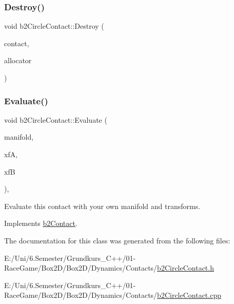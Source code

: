 \subsubsection{\texorpdfstring{Destroy()}{Destroy()}}
{\footnotesize\ttfamily void b2\+Circle\+Contact\+::\+Destroy (\begin{DoxyParamCaption}\item[{\mbox{\hyperlink{classb2_contact}{b2\+Contact}} $\ast$}]{contact,  }\item[{\mbox{\hyperlink{classb2_block_allocator}{b2\+Block\+Allocator}} $\ast$}]{allocator }\end{DoxyParamCaption})\hspace{0.3cm}{\ttfamily [static]}}

\mbox{\label{classb2_circle_contact_a90036965fd66469e916a5afc6c244092}} 
\subsubsection{\texorpdfstring{Evaluate()}{Evaluate()}}
{\footnotesize\ttfamily void b2\+Circle\+Contact\+::\+Evaluate (\begin{DoxyParamCaption}\item[{\mbox{\hyperlink{structb2_manifold}{b2\+Manifold}} $\ast$}]{manifold,  }\item[{const \mbox{\hyperlink{structb2_transform}{b2\+Transform}} \&}]{xfA,  }\item[{const \mbox{\hyperlink{structb2_transform}{b2\+Transform}} \&}]{xfB }\end{DoxyParamCaption})\hspace{0.3cm}{\ttfamily [override]}, {\ttfamily [virtual]}}



Evaluate this contact with your own manifold and transforms. 



Implements \mbox{\hyperlink{classb2_contact_ae3c2842e5325b2d4500f8ed1d4de2f72}{b2\+Contact}}.



The documentation for this class was generated from the following files\+:\begin{DoxyCompactItemize}
\item 
E\+:/\+Uni/6.\+Semester/\+Grundkurs\+\_\+\+C++/01-\/\+Race\+Game/\+Box2\+D/\+Box2\+D/\+Dynamics/\+Contacts/\mbox{\hyperlink{b2_circle_contact_8h}{b2\+Circle\+Contact.\+h}}\item 
E\+:/\+Uni/6.\+Semester/\+Grundkurs\+\_\+\+C++/01-\/\+Race\+Game/\+Box2\+D/\+Box2\+D/\+Dynamics/\+Contacts/\mbox{\hyperlink{b2_circle_contact_8cpp}{b2\+Circle\+Contact.\+cpp}}\end{DoxyCompactItemize}
